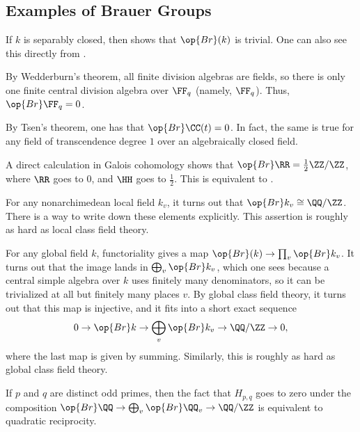 \documentclass[../notes.tex]{subfiles}
\begin{document}
\subsection{Examples of Brauer Groups}
\begin{example}
	If $k$ is separably closed, then  shows that $\op{Br}(k)$ is trivial. One can also see this directly from .
\end{example}
\begin{example}
	By Wedderburn's theorem, all finite division algebras are fields, so there is only one finite central division algebra over $\FF_q$ (namely, $\FF_q$). Thus, $\op{Br}\FF_q=0$.
\end{example}
\begin{example}
	By Tsen's theorem, one has that $\op{Br}\CC(t)=0$. In fact, the same is true for any field of transcendence degree $1$ over an algebraically closed field.
\end{example}
\begin{example}
	A direct calculation in Galois cohomology shows that $\op{Br}\RR=\frac12\ZZ/\ZZ$, where $\RR$ goes to $0$, and $\HH$ goes to $\frac12$. This is equivalent to .
\end{example}
\begin{example}
	For any nonarchimedean local field $k_v$, it turns out that $\op{Br}k_v\cong\QQ/\ZZ$. There is a way to write down these elements explicitly. This assertion is roughly as hard as local class field theory.
\end{example}
\begin{example} \label{ex:cft-exact-seq}
	For any global field $k$, functoriality gives a map $\op{Br}(k)\to\prod_v\op{Br}k_v$. It turns out that the image lands in $\bigoplus_v\op{Br}k_v$, which one sees because a central simple algebra over $k$ uses finitely many denominators, so it can be trivialized at all but finitely many places $v$. By global class field theory, it turns out that this map is injective, and it fits into a short exact sequence
	\[0\to\op{Br}k\to\bigoplus_v\op{Br}k_v\to\QQ/\ZZ\to0,\]
	where the last map is given by summing. Similarly, this is roughly as hard as global class field theory.
\end{example}
\begin{remark}
	If $p$ and $q$ are distinct odd primes, then the fact that $H_{p,q}$ goes to zero under the composition $\op{Br}\QQ\to\bigoplus_v\op{Br}\QQ_v\to\QQ/\ZZ$ is equivalent to quadratic reciprocity.
\end{remark}
\end{document}
